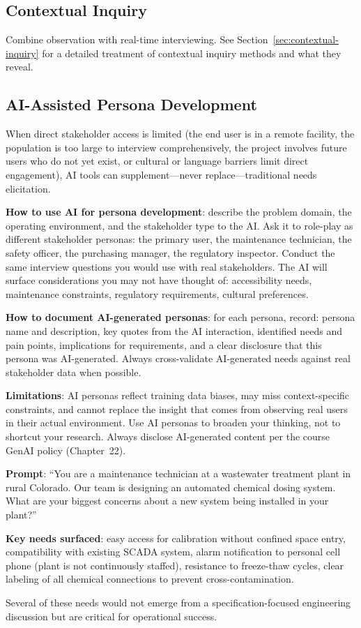 \subsection{Contextual Inquiry}
Combine observation with real-time interviewing. See Section~\ref{sec:contextual-inquiry} for a detailed treatment of contextual inquiry methods and what they reveal.

\subsection{AI-Assisted Persona Development}\label{subsec:ai-persona}
When direct stakeholder access is limited (the end user is in a remote facility, the population is too large to interview comprehensively, the project involves future users who do not yet exist, or cultural or language barriers limit direct engagement), AI tools can supplement---never replace---traditional needs elicitation.

\textbf{How to use AI for persona development}: describe the problem domain, the operating environment, and the stakeholder type to the AI. Ask it to role-play as different stakeholder personas: the primary user, the maintenance technician, the safety officer, the purchasing manager, the regulatory inspector. Conduct the same interview questions you would use with real stakeholders. The AI will surface considerations you may not have thought of: accessibility needs, maintenance constraints, regulatory requirements, cultural preferences.

\textbf{How to document AI-generated personas}: for each persona, record: persona name and description, key quotes from the AI interaction, identified needs and pain points, implications for requirements, and a clear disclosure that this persona was AI-generated. Always cross-validate AI-generated needs against real stakeholder data when possible.

\textbf{Limitations}: AI personas reflect training data biases, may miss context-specific constraints, and cannot replace the insight that comes from observing real users in their actual environment. Use AI personas to broaden your thinking, not to shortcut your research. Always disclose AI-generated content per the course GenAI policy (Chapter~22).

\begin{examplebox}
\textbf{Prompt}: ``You are a maintenance technician at a wastewater treatment plant in rural Colorado. Our team is designing an automated chemical dosing system. What are your biggest concerns about a new system being installed in your plant?''

\textbf{Key needs surfaced}: easy access for calibration without confined space entry, compatibility with existing SCADA system, alarm notification to personal cell phone (plant is not continuously staffed), resistance to freeze-thaw cycles, clear labeling of all chemical connections to prevent cross-contamination.

Several of these needs would not emerge from a specification-focused engineering discussion but are critical for operational success.
\end{examplebox}

